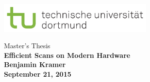 \thispagestyle{empty}
\vspace*{-2.5cm}
\newlength{\links}
\setlength{\links}{0cm}
\sf

\hspace*{\links}
\begin{minipage}{12.5cm}
\includegraphics[width=7.75cm]{images/tud_logo_rgb}
\end{minipage}

\vspace*{3.6cm}

\hspace*{\links}
\hspace*{0.0cm}
\begin{minipage}{9cm}
\large
\begin{center}
{\LARGE Master's Thesis}\\
\vspace*{1cm}
\bf{\LARGE Efficient Scans on Modern Hardware}\\
\vspace*{1.5cm}
\large Benjamin Kramer\\
September 21, 2015
\end{center}
\end{minipage}

\vspace*{3cm}

\hspace*{\links}


\vspace*{.6cm}

